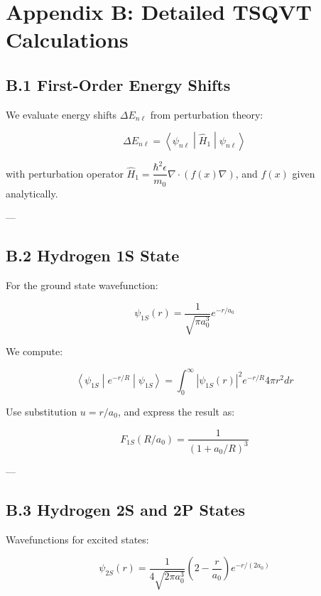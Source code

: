 \section*{Appendix B: Detailed TSQVT Calculations}

\subsection*{B.1 First-Order Energy Shifts}

We evaluate energy shifts \(\Delta E_{n\ell}\) from perturbation theory:



\[
\Delta E_{n\ell} = \left\langle \psi_{n\ell} \middle| \hat{H}_1 \middle| \psi_{n\ell} \right\rangle
\]



with perturbation operator \(\hat{H}_1 = \dfrac{\hbar^2 \epsilon}{m_0} \nabla \cdot \left( f(x) \nabla \right)\), and \(f(x)\) given analytically.

---

\subsection*{B.2 Hydrogen 1S State}

For the ground state wavefunction:



\[
\psi_{1S}(r) = \dfrac{1}{\sqrt{\pi a_0^3}} e^{-r/a_0}
\]



We compute:



\[
\left\langle \psi_{1S} \middle| e^{-r/R} \middle| \psi_{1S} \right\rangle = \int_0^\infty \left| \psi_{1S}(r) \right|^2 e^{-r/R} 4\pi r^2 dr
\]



Use substitution \(u = r/a_0\), and express the result as:



\[
F_{1S}(R/a_0) = \dfrac{1}{(1 + a_0 / R)^3}
\]



---

\subsection*{B.3 Hydrogen 2S and 2P States}

Wavefunctions for excited states:



\[
\psi_{2S}(r) = \dfrac{1}{4\sqrt{2\pi a_0^3}} \left( 2 - \dfrac{r}{a_0} \right) e^{-r/(2a_0)}
\]





